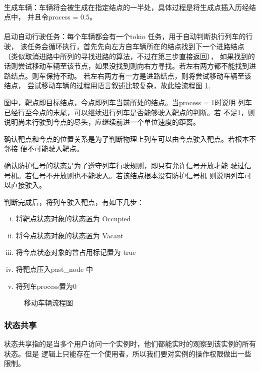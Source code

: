 \paragraph{}生成车辆：车辆将会被生成在指定结点的一半处，具体过程是将生成点插入历经结点中，
并且令process = 0.5。

\paragraph{}启动自动行驶任务：每个车辆都会有一个tokio 任务，用于自动判断执行列车的行驶，
该任务会循环执行，首先先向左方自车辆所在的结点找到下一个进路结点（类似取消进路中所列的寻找进路的算法，不过在第三步直接返回），
如果找到的话则尝试移动车辆至该节点，如果没找到则向右方寻找。若左右两方都不能找到进路结点。则车保持不动。
若左右两方有一方是进路结点，则将尝试移动车辆至该结点，
尝试移动车辆的过程用语言叙述比较复杂，故此绘流程图 \ref{tmf},

图中，靶点即目标结点，今点即列车当前所处的结点。当process = 1时说明
列车已经行至今点的末尾，可以继续进行列车是否能够驶入靶点的判断。若
不足1，则说明尚未行驶到今点的尽头，应继续前进一个单位速度的距离。

确认靶点和今点的位置关系是为了判断物理上列车可以由今点驶入靶点。若根本不邻接
便不可能驶入靶点。

确认防护信号的状态是为了遵守列车行驶规则，即只有允许信号开放才能
驶过信号机。若信号不开放则也不能驶入。若该结点根本没有防护信号机
则说明列车可以直接驶入。

判断完成后，将列车驶入靶点，有如下几步：

\begin{enumerate}[i.]
    \item 将靶点状态对象的状态置为 Occupied
    \item 将今点状态对象的状态置为 Vacant
    \item 将今点状态对象的曾占用标记置为 true
    \item 将靶点压入past\_node 中
    \item 将列车process置为0
\end{enumerate}

\begin{figure}[htbp!]
    \centering
    
    \caption{\label{tmf}移动车辆流程图}
\end{figure}

\subsubsection{状态共享}
状态共享指的是当多个用户访问一个实例时，他们都能实时的观察到该实例的所有状态。但是
逻辑上只能存在一个使用者，所以我们要对实例的操作权限做出一些限制。

